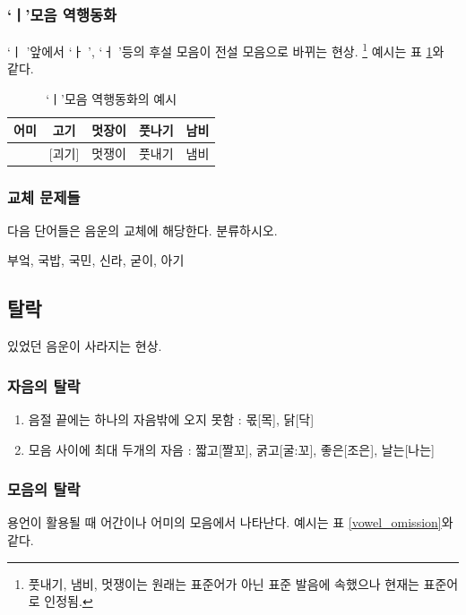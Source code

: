 \documentclass[10pt]{report}
\newcommand{\tl}{\textquoteleft}
\newcommand{\tr}{\textquoteright}
\begin{document}
\subsubsection{\tl ㅣ\tr 모음 역행동화}
\tl ㅣ \tr 앞에서 \tl ㅏ \tr, \tl ㅓ \tr 등의 후설 모음이 전설 모음으로 바뀌는 현상. \footnote{풋내기, 냄비, 멋쟁이는 원래는 표준어가 아닌 표준 발음에 속했으나 현재는 표준어로 인정됨.} 예시는 표 \ref{counter_story}와 같다.

\begin{table}
\begin{center}
	\begin{tabular}{|c|c|c|c|c|}
		\hline
		어미 & 고기 & 멋장이 & 풋나기 & 남비 \\
		\hline
		[에미] & [괴기] & 멋쟁이 & 풋내기 & 냄비\\
		\hline
	\end{tabular}
	\caption{\tl ㅣ\tr 모음 역행동화의 예시}
	\label{counter_story}
\end{center}
\end{table}

\subsubsection{교체 문제들}
다음 단어들은 음운의 교체에 해당한다. 분류하시오.
\begin{center}
	부엌, 국밥, 국민, 신라, 굳이, 아기
\end{center}

\subsection{탈락}
있었던 음운이 사라지는 현상.
\subsubsection{자음의 탈락}
\begin{enumerate}
\item 음절 끝에는 하나의 자음밖에 오지 못함 : 몫[목], 닭[닥]
\item 모음 사이에 최대 두개의 자음 : 짧고[짤꼬], 굵고[굴:꼬], 좋은[조은], 날는[나는]
\end{enumerate}

\subsubsection{모음의 탈락}
용언이 활용될 때 어간이나 어미의 모음에서 나타난다. 예시는 표 \ref{vowel_omission}와 같다.
\end{document}
